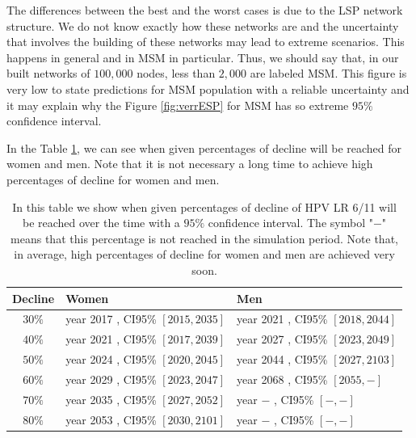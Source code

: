 The differences between the best and the worst cases is due to the LSP network structure. We do not know exactly how these networks are and the uncertainty that involves the building of these networks may lead to extreme scenarios. This happens in general and in MSM in particular. Thus, we should say that, in our built networks of $100,000$ nodes, less than $2,000$ are labeled MSM. This figure is very low to state predictions for MSM population with a reliable uncertainty and it may explain why the Figure \ref{fig:verrESP} for MSM has so extreme $95\%$ confidence interval.

In the Table \ref{tabla:verrESP}, we can see when given percentages of decline will be reached for women and men. Note that it is not necessary a long time to achieve high percentages of decline for women and men.

\begin{table}[!h]
\centering
\begin{tabular}{c|ll}
	Decline & Women & Men  \\ 
	\hline 
$ 30 \%$ & year  2017 , CI95\% $[ 2015 , 2035 ]$ & year  2021 , CI95\% $[ 2018 , 2044 ]$  \\
$ 40 \%$ & year  2021 , CI95\% $[ 2017 , 2039 ]$ & year  2027 , CI95\% $[ 2023 , 2049 ]$  \\	
$ 50 \%$ & year  2024 , CI95\% $[ 2020 , 2045 ]$ & year  2044 , CI95\% $[ 2027 , 2103 ]$  \\
$ 60 \%$ & year  2029 , CI95\% $[ 2023 , 2047 ]$ & year  2068 , CI95\% $[ 2055 , - ]$  \\
$ 70 \%$ & year  2035 , CI95\% $[ 2027 , 2052 ]$ & year  $-$ , CI95\% $[ - , - ]$  \\
$ 80 \%$ & year  2053 , CI95\% $[ 2030 , 2101 ]$ & year  $-$ , CI95\% $[ - , - ]$  \\
\end{tabular} 
\caption{In this table we show when given percentages of decline of HPV LR 6/11 will be reached over the time with a $95\%$ confidence interval. The symbol "$-$" means that this percentage is not reached in the simulation period. Note that, in average, high percentages of decline for women and men are achieved very soon.}
\label{tabla:verrESP}
\end{table}


